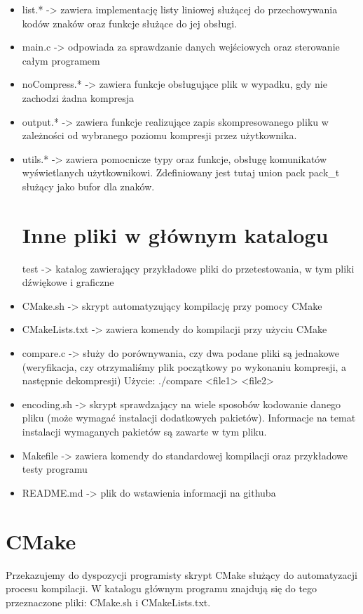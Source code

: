 \documentclass[]{article}
\begin{document}
\begin{itemize}
\item
list.* -> zawiera implementację listy liniowej służącej do przechowywania kodów znaków oraz funkcje służące do jej obsługi.
\item
main.c -> odpowiada za sprawdzanie danych wejściowych oraz sterowanie całym programem
\item
noCompress.* -> zawiera funkcje obsługujące plik w wypadku, gdy nie zachodzi żadna kompresja
\item
output.* -> zawiera funkcje realizujące zapis skompresowanego pliku w zależności od wybranego poziomu kompresji przez użytkownika.
\item
utils.* -> zawiera pomocnicze typy oraz funkcje, obsługę komunikatów wyświetlanych użytkownikowi. Zdefiniowany jest tutaj union pack pack\_t służący jako bufor dla znaków. 
\section{Inne pliki w głównym katalogu}\label{header-n231}
test -> katalog zawierający przykładowe pliki do przetestowania, w tym pliki dźwiękowe i graficzne
\item
CMake.sh -> skrypt automatyzujący kompilację przy pomocy CMake
\item
CMakeLists.txt -> zawiera komendy do kompilacji przy użyciu CMake
\item
compare.c -> służy do porównywania, czy dwa podane pliki są jednakowe (weryfikacja, czy otrzymaliśmy plik początkowy po wykonaniu kompresji, a następnie dekompresji) Użycie: ./compare <file1> <file2>
\item
encoding.sh -> skrypt sprawdzający na wiele sposobów kodowanie danego pliku (może wymagać instalacji dodatkowych pakietów). Informacje na temat instalacji wymaganych pakietów są zawarte w tym pliku.
\item
Makefile -> zawiera komendy do standardowej kompilacji oraz przykładowe testy programu
\item
README.md -> plik do wstawienia informacji na githuba

\end{itemize}

\section{CMake}\label{header-n231}
Przekazujemy do dyspozycji programisty skrypt CMake służący do automatyzacji procesu kompilacji. W katalogu głównym programu znajdują się do tego przeznaczone pliki: CMake.sh i CMakeLists.txt.
\end{document}
